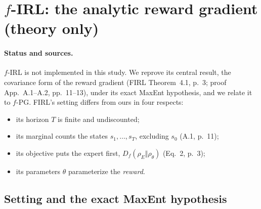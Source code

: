 \section{\texorpdfstring{$f$}{f}-IRL: the analytic reward gradient (theory only)}\label{sec:firl}

\paragraph{Status and sources.}
$f$-IRL is not implemented in this study.
We reprove its central result, the covariance form of the reward gradient (FIRL Theorem~4.1, p.~3; proof App.~A.1--A.2, pp.~11--13), under its exact MaxEnt hypothesis, and we relate it to $f$-PG.
FIRL's setting differs from ours in four respects:
\begin{itemize}[nosep]
\item its horizon $T$ is finite and undiscounted;
\item its marginal counts the states $s_1,\dots,s_T$, excluding $s_0$ (A.1, p.~11);
\item its objective puts the expert first, $D_f(\rho_E\Vert\rho_\theta)$ (Eq.~2, p.~3);
\item its parameters $\theta$ parameterize the \emph{reward}.
\end{itemize}

\subsection{Setting and the exact MaxEnt hypothesis}


